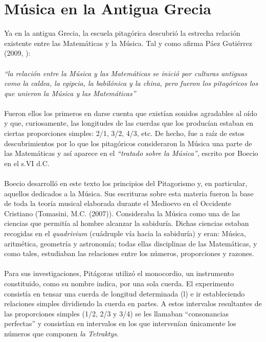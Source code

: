 \documentclass[a4paper, openright, 11pt, titlepage]{report}
\theoremstyle{definition}\newtheorem{defin}[propo]{Definition}
\theoremstyle{definition}\newtheorem{obser}[propo]{Remark}
\theoremstyle{definition}\newtheorem{ejem}[propo]{Ejemplo}
\theoremstyle{definition}\newtheorem{algoritmo}[propo]{Algoritmo}
\begin{document}
\chapter{Música en la Antigua Grecia}
Ya en la antigua Grecia, la escuela pitagórica descubrió la estrecha relación existente entre las Matemáticas y la Música. Tal y como afirma Páez Gutiérrez (2009, \cite{paez}):\\\\
\textit{``la relación entre la Música y las Matemáticas se inició por culturas antiguas como la caldea, la egipcia, la babilónica y la china, pero fueron los pitagóricos los que unieron la Música y las Matemáticas''}\\\\
Fueron ellos los primeros en darse cuenta que existían sonidos agradables al oído y que, curiosamente, las longitudes de las cuerdas que los producían estaban en ciertas proporciones simples: 2/1, 3/2, 4/3, etc. De hecho, fue a raíz de estos descubrimientos por lo que los pitagóricos consideraron la Música una parte de las Matemáticas y así aparece en el \textit{``tratado sobre la Música''}, escrito por Boecio en el s.VI d.C.\\\\
Boecio desarrolló en este texto los principios del Pitagorismo y, en particular, aquellos dedicados a la Música. Sus escrituras sobre esta materia fueron la base de toda la teoría musical elaborada durante el Medioevo en el Occidente Cristiano \cite{tomasini} (Tomasini, M.C. (2007)). Consideraba la Música como una de las ciencias que permitía al hombre alcanzar la sabiduría. Dichas ciencias estaban recogidas en el \textit{quadrivium} (cuádruple vía hacia la sabiduría) y eran: Música, aritmética, geometría y astronomía; todas ellas disciplinas de las Matemáticas, y como tales, estudiaban las relaciones entre los números, proporciones y razones.\\\\
Para sus investigaciones, Pitágoras utilizó el monocordio, un instrumento constituido, como su nombre indica, por una sola cuerda. El experimento consistía en tensar una cuerda de longitud determinada (l) e ir estableciendo relaciones simples dividiendo la cuerda en partes. A estos intervalos resultantes de las proporciones simples (1/2, 2/3 y 3/4) se les llamaban ``consonancias perfectas'' y consistían en intervalos en los que intervenían únicamente los números que componen \textit{la Tetraktys}.\\\\
\end{document}
